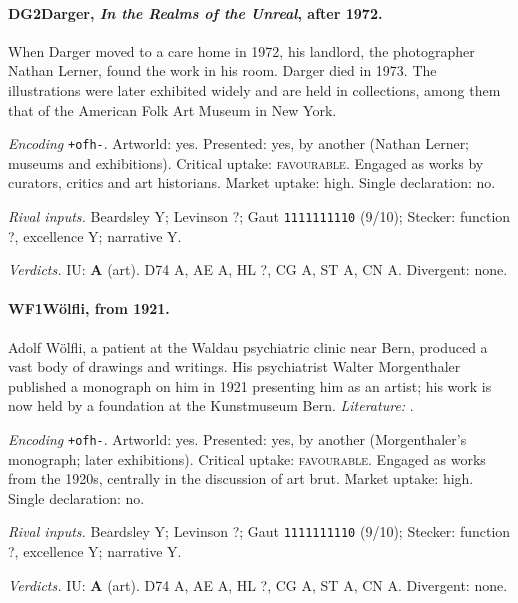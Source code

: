 \paragraph{DG2\enspace Darger, \emph{In the Realms of the Unreal}, after 1972.}
When Darger moved to a care home in 1972, his landlord, the photographer Nathan Lerner, found the work in his room. Darger died in 1973. The illustrations were later exhibited widely and are held in collections, among them that of the American Folk Art Museum in New York.\par
\noindent\textit{Encoding} \texttt{+ofh-}. Artworld: yes. Presented: yes, by another (Nathan Lerner; museums and exhibitions). Critical uptake: \textsc{favourable}. Engaged as works by curators, critics and art historians. Market uptake: high. Single declaration: no.\par
\noindent\textit{Rival inputs.} Beardsley Y; Levinson ?; Gaut \texttt{1111111110} (9/10); Stecker: function ?, excellence Y; narrative Y.\par
\noindent\textit{Verdicts.} IU: \textbf{A} (art). D74 A, AE A, HL ?, CG A, ST A, CN A. Divergent: none.\par

\paragraph{WF1\enspace W\"olfli, from 1921.}
Adolf W\"olfli, a patient at the Waldau psychiatric clinic near Bern, produced a vast body of drawings and writings. His psychiatrist Walter Morgenthaler published a monograph on him in 1921 presenting him as an artist; his work is now held by a foundation at the Kunstmuseum Bern. \textit{Literature:} \citet{Morgenthaler1921}.\par
\noindent\textit{Encoding} \texttt{+ofh-}. Artworld: yes. Presented: yes, by another (Morgenthaler's monograph; later exhibitions). Critical uptake: \textsc{favourable}. Engaged as works from the 1920s, centrally in the discussion of art brut. Market uptake: high. Single declaration: no.\par
\noindent\textit{Rival inputs.} Beardsley Y; Levinson ?; Gaut \texttt{1111111110} (9/10); Stecker: function ?, excellence Y; narrative Y.\par
\noindent\textit{Verdicts.} IU: \textbf{A} (art). D74 A, AE A, HL ?, CG A, ST A, CN A. Divergent: none.\par

